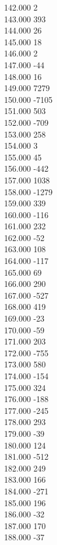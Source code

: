 { 142.000	2 \\
 143.000	393 \\
 144.000	26 \\
 145.000	18 \\
 146.000	2 \\
 147.000	-44 \\
 148.000	16 \\
 149.000	7279 \\
 150.000	-7105 \\
 151.000	503 \\
 152.000	-709 \\
 153.000	258 \\
 154.000	3 \\
 155.000	45 \\
 156.000	-442 \\
 157.000	1038 \\
 158.000	-1279 \\
 159.000	339 \\
 160.000	-116 \\
 161.000	232 \\
 162.000	-52 \\
 163.000	108 \\
 164.000	-117 \\
 165.000	69 \\
 166.000	290 \\
 167.000	-527 \\
 168.000	419 \\
 169.000	-23 \\
 170.000	-59 \\
 171.000	203 \\
 172.000	-755 \\
 173.000	580 \\
 174.000	-154 \\
 175.000	324 \\
 176.000	-188 \\
 177.000	-245 \\
 178.000	293 \\
 179.000	-39 \\
 180.000	124 \\
 181.000	-512 \\
 182.000	249 \\
 183.000	166 \\
 184.000	-271 \\
 185.000	196 \\
 186.000	-32 \\
 187.000	170 \\
 188.000	-37 \\
}
